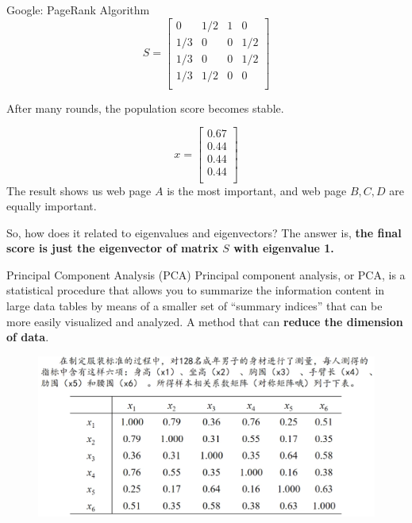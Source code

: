 \documentclass{beamer}
\begin{document}
\begin{frame}{Google: PageRank Algorithm}
\begin{equation*}
    S=\left[ \begin{matrix}
        0&		1/2&		1&		0\\
        1/3&		0&		0&		1/2\\
        1/3&		0&		0&		1/2\\
        1/3&		1/2&		0&		0\\
    \end{matrix} \right]
\end{equation*}

After many rounds, the population score becomes stable.

\begin{equation*}
    x=\left[ \begin{array}{c}
        0.67\\
        0.44\\
        0.44\\
        0.44\\
    \end{array} \right]
\end{equation*}
The result shows us web page $A$ is the most important, and web page $B,C,D$ are equally important.

\vspace{3pt}
So, how does it related to eigenvalues and eigenvectors? The answer is, \textbf{the final score is just the eigenvector of matrix $S$ with eigenvalue 1.}

\end{frame}

\begin{frame}{Principal Component Analysis (PCA)}
Principal component analysis, or PCA, is a statistical procedure that allows you to summarize the information content in large data tables by means of a smaller set of “summary indices” that can be more easily visualized and analyzed. A method that can \textbf{reduce the dimension of data}.
\begin{figure}
    \includegraphics[width=\textwidth]{pca.png}
\end{figure}
\end{frame}
\end{document}
